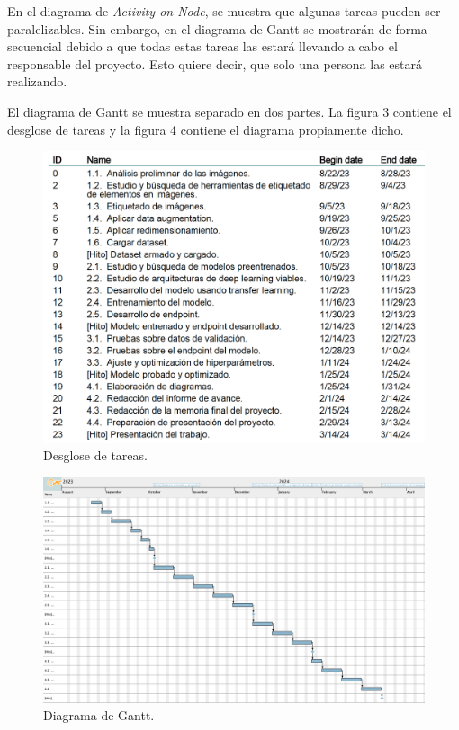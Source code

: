\documentclass[
11pt, %
]{charter}
\begin{document}
En el diagrama de \textit{Activity on Node}, se muestra que algunas tareas pueden ser paralelizables. Sin embargo, en el diagrama de Gantt se mostrarán de forma secuencial debido a que todas estas tareas las estará llevando a cabo el responsable del proyecto. Esto quiere decir, que solo una persona las estará realizando.

El diagrama de Gantt se muestra separado en dos partes. La figura 3 contiene el desglose de tareas y la figura 4 contiene el diagrama propiamente dicho.

\begin{figure}[htpb]
\centering 
\includegraphics[width=.8\textwidth]{./Figuras/TableG3.png}
\caption{Desglose de tareas.}
\label{fig:diagBloques}
\end{figure}


\begin{landscape}
\begin{figure}[htpb]
\centering 
\includegraphics[height=.85\textheight]{./Figuras/Gantt.png}
\caption{Diagrama de Gantt.}
\label{fig:diagGantt}
\end{figure}

\end{landscape}
\end{document}
